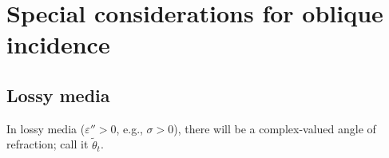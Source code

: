 \documentclass[11pt, oneside]{article}
\begin{document}
\section{Special considerations for oblique incidence}

\subsection{Lossy media}
\label{s:lossy}

In lossy media ($\varepsilon'' > 0$, e.g., $\sigma > 0$), there will be a complex-valued angle of refraction; call it $\tilde{\theta}_t$.
\end{document}
